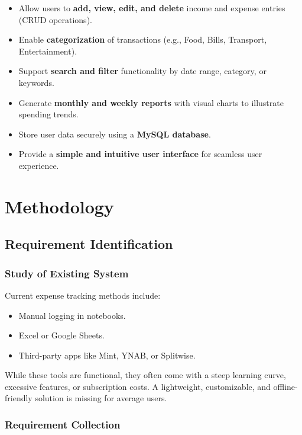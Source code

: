 \documentclass[a4paper,12pt]{article}
\begin{document}
\begin{itemize}
    \item Allow users to \textbf{add, view, edit, and delete} income and expense entries (CRUD operations).
    \item Enable \textbf{categorization} of transactions (e.g., Food, Bills, Transport, Entertainment).
    \item Support \textbf{search and filter} functionality by date range, category, or keywords.
    \item Generate \textbf{monthly and weekly reports} with visual charts to illustrate spending trends.
    \item Store user data securely using a \textbf{MySQL database}.
    \item Provide a \textbf{simple and intuitive user interface} for seamless user experience.
\end{itemize}

\section{Methodology}

\subsection{Requirement Identification}

\subsubsection{Study of Existing System}
    Current expense tracking methods include:

\begin{itemize}
    \item Manual logging in notebooks.
    \item Excel or Google Sheets.
    \item Third-party apps like Mint, YNAB, or Splitwise.
\end{itemize}

While these tools are functional, they often come with a steep learning curve, excessive features, or subscription costs. A lightweight, customizable, and offline-friendly solution is missing for average users.

\subsubsection{Requirement Collection}
\end{document}
